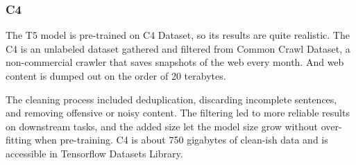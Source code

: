 \subsubsection*{\ac{C4}}

The T5 model is pre-trained on C4 Dataset\cite{raffel_exploring_2020}, so its results are quite realistic.
The C4 is an unlabeled dataset gathered and filtered from Common Crawl Dataset, a non-commercial crawler that saves snapshots of the web every month. And web content is dumped out on the order of 20 terabytes.

The cleaning process included deduplication, discarding incomplete sentences, and removing offensive or noisy content. The filtering led to more reliable results on downstream tasks, and the added size let the model size grow without over-fitting when pre-training. C4 is about 750 gigabytes of clean-ish data and is accessible in Tensorflow Datasets Library.